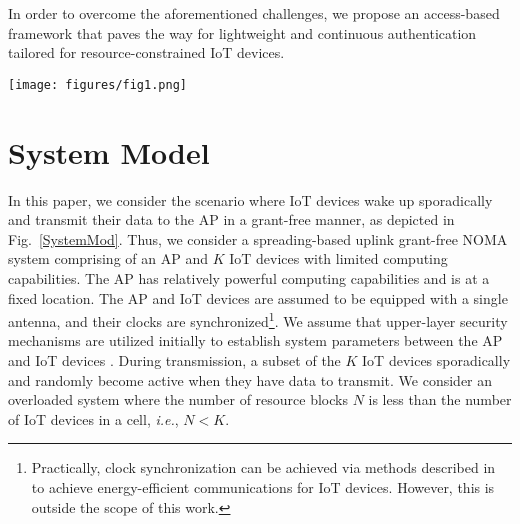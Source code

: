 \documentclass[journal,10pt]{IEEEtran}
\begin{document}
In order to overcome the aforementioned challenges, we propose an access-based framework that paves the way for lightweight and continuous authentication tailored for resource-constrained IoT devices.

\begin{figure*}[t]
\centering
\texttt{[image: figures/fig1.png]} 
\caption{Illustration of our system model. The transmission between the IoT devices and the AP is carried out by following the pre-agreed access time slots.}
\label{SystemMod}
\end{figure*}

\section{System Model}
In this paper, we consider the scenario where IoT devices wake up sporadically and transmit their data to the AP in a grant-free manner, as depicted in Fig.~\ref{SystemMod}. 
Thus, we consider a spreading-based uplink grant-free NOMA system comprising of an AP and $K$ IoT devices with limited computing capabilities. The AP has relatively powerful computing capabilities and is at a fixed location. The AP and IoT devices are assumed to be equipped with a single antenna, and their clocks are synchronized\footnote{Practically, clock synchronization can be achieved via methods described in \cite{8008773, 8125129, 6774858} to achieve energy-efficient communications for IoT devices. However, this is outside the scope of this work.}. We assume that upper-layer security mechanisms are utilized initially to establish system parameters between the AP and IoT devices \cite{9446939}. During transmission, a subset of the $K$ IoT devices sporadically and randomly become active when they have data to transmit. We consider an overloaded system where the number of resource blocks $N$ is less than the number of IoT devices in a cell, \emph{i.e.}, $N < K$.
\end{document}
